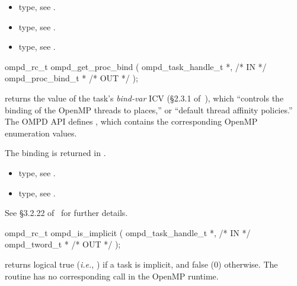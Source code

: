 \crossreferences
\begin{itemize}
	\item {} type, see .
	\item {} type, see .
	\item {} type, see .
\end{itemize}


%
\summary

\format
\cspecificstart
\begin{boxedcode}
ompd\_rc\_t ompd\_get\_proc\_bind (
  ompd\_task\_handle\_t        *,                           /* IN */
  ompd\_proc\_bind\_t          *                                  /* OUT */
); 
\end{boxedcode}
\cspecificend

\descr
{} returns the value of the task's
\emph{bind-var} ICV (\S2.3.1 of~\cite{OpenMP}), which ``controls the
binding of the OpenMP threads to places,'' or ``default thread
affinity policies.''
%
The OMPD API defines
, which
contains the corresponding OpenMP enumeration values.
%

\argdesc
The binding is returned in .
%

\crossreferences
\begin{itemize}
	\item {} type, see .
	\item {} type, see .
\end{itemize}
See \S3.2.22 of~\cite{OpenMP} for further details.

\summary

\format
\cspecificstart
\begin{boxedcode}
ompd\_rc\_t ompd\_is\_implicit (
  ompd\_task\_handle\_t  *,                                 /* IN */
  ompd\_tword\_t        *                                         /* OUT */
); 
\end{boxedcode}
\cspecificend

\descr
{} returns logical true (\textit{i.e.}, )
if a task is implicit, and false (0) otherwise.
The routine has no corresponding call in the OpenMP runtime.

